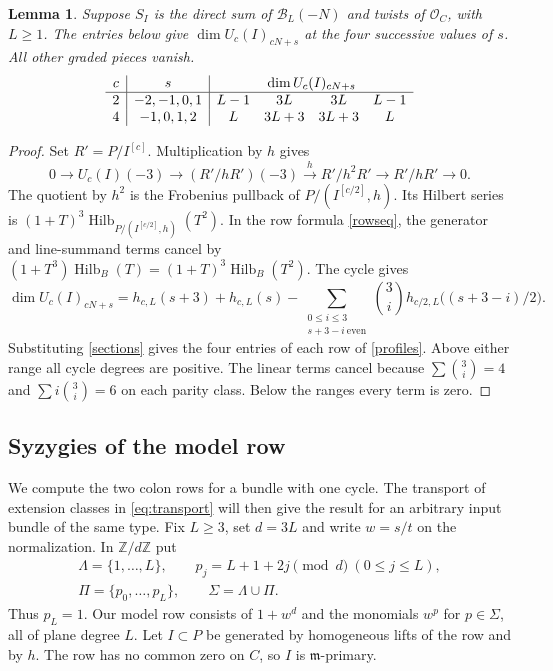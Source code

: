 \documentclass[11pt,a4paper,reqno]{amsart}
\numberwithin{equation}{section}
\theoremstyle{plain}
\newtheorem{lemma}[theorem]{Lemma}
\newcommand{\OO}{\mathcal O}
\newcommand{\Bcal}{\mathcal B}
\newcommand{\m}{\mathfrak m}
\DeclareMathOperator{\Hilb}{Hilb}
\begin{document}
\begin{lemma}\label{profile}
Suppose $S_I$ is the direct sum of $\Bcal_L(-N)$ and twists of $\OO_C$, with $L\ge1$. The entries below give $\dim U_c(I)_{cN+s}$ at the four successive values of $s$. All other graded pieces vanish.
\begin{equation}\label{profiles}
\begin{array}{c|c|cccc}
 c&s&\multicolumn{4}{c}{\dim U_c(I)_{cN+s}}\\ \hline
 2&-2,-1,0,1&L-1&3L&3L&L-1\\
 4&-1,0,1,2&L&3L+3&3L+3&L
\end{array}
\end{equation}
\end{lemma}
\begin{proof}
Set $R'=P/I^{[c]}$. Multiplication by $h$ gives
\[
 0\longrightarrow U_c(I)(-3)\longrightarrow (R'/hR')(-3)
   \xrightarrow{h}R'/h^2R'\longrightarrow R'/hR'\longrightarrow0 .
\]
The quotient by $h^2$ is the Frobenius pullback of $P/(I^{[c/2]},h)$. Its Hilbert series is $(1+T)^3\Hilb_{P/(I^{[c/2]},h)}(T^2)$. In the row formula \eqref{rowseq}, the generator and line-summand terms cancel by $(1+T^3)\Hilb_B(T)=(1+T)^3\Hilb_B(T^2)$. The cycle gives
\begin{equation}\label{profilesum}
 \dim U_c(I)_{cN+s}=h_{c,L}(s+3)+h_{c,L}(s)
 -\sum_{\substack{0\le i\le3\\s+3-i\ {\mathrm{even}}}}
     \binom3i h_{c/2,L}\big((s+3-i)/2\big).
\end{equation}
Substituting \eqref{sections} gives the four entries of each row of \eqref{profiles}. Above either range all cycle degrees are positive. The linear terms cancel because $\sum\binom3i=4$ and $\sum i\binom3i=6$ on each parity class. Below the ranges every term is zero.
\end{proof}

\subsection{Syzygies of the model row}\label{sec:model-row}

We compute the two colon rows for a bundle with one cycle. The transport of extension classes in \eqref{eq:transport} will then give the result for an arbitrary input bundle of the same type. Fix $L\ge3$, set $d=3L$ and write $w=s/t$ on the normalization. In $\mathbb Z/d\mathbb Z$ put
\[
 \begin{gathered}\Lambda=\{1,\ldots,L\},\qquad p_j=L+1+2j\pmod d\ (0\le j\le L),\\
 \Pi=\{p_0,\ldots,p_L\},\qquad \Sigma=\Lambda\cup\Pi .\end{gathered}
\]
Thus $p_L=1$. Our model row consists of $1+w^d$ and the monomials $w^p$ for $p\in\Sigma$, all of plane degree $L$. Let $I\subset P$ be generated by homogeneous lifts of the row and by $h$. The row has no common zero on $C$, so $I$ is $\m$-primary.
\end{document}
